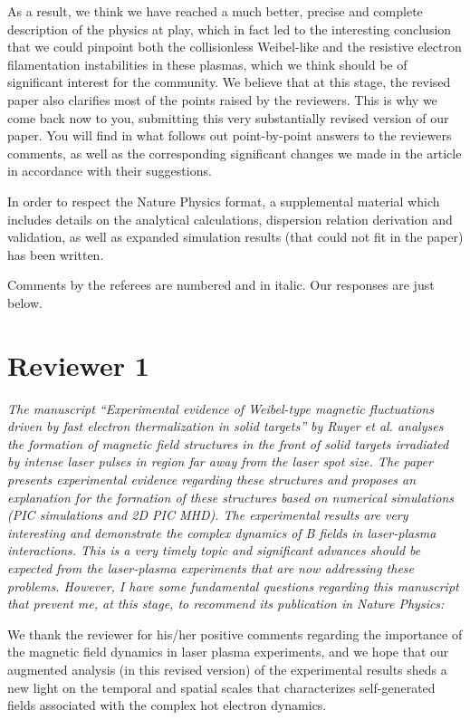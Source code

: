 \documentclass[aps,showpacs,superscriptaddress]{revtex4}%
\begin{document}
As a result, we think we have reached a much better, precise and complete description of the physics at play, which in fact led to the interesting conclusion that we could pinpoint both the  collisionless Weibel-like and the resistive electron filamentation instabilities in these plasmas, which we think should be of significant interest for the community. We believe that at this stage, the revised paper also clarifies most of the points raised by the reviewers. 
This is why we come back now to you, submitting this very substantially revised version of our paper. You will find in what follows out point-by-point answers to the reviewers comments, as well as the corresponding significant changes we made in the article in accordance with their suggestions.

In order to respect the Nature Physics format, a supplemental material which includes details on the analytical calculations, dispersion relation derivation and validation, as well as expanded simulation results (that could not fit in the paper) has been written.

Comments by the referees are numbered and in italic. Our responses are just below.


\section{Reviewer 1 }

\textit{
The manuscript “Experimental evidence of Weibel-type magnetic fluctuations driven by fast electron thermalization in solid targets” by Ruyer et al. analyses the formation of magnetic field structures in the front of solid targets irradiated by intense laser pulses in region far away from the laser spot size. The paper presents experimental evidence regarding these structures and proposes an explanation for the formation of these structures based on numerical simulations (PIC simulations and 2D PIC MHD). The experimental results are very interesting and demonstrate the complex dynamics of B fields in laser-plasma interactions. This is a very timely topic and significant advances should be expected from the laser-plasma experiments that are now addressing these problems.
However, I have some fundamental questions regarding this manuscript that prevent me, at this stage, to recommend its publication in Nature Physics:
}

We thank the reviewer for his/her positive comments regarding  the importance of the magnetic field dynamics in laser plasma experiments, and we hope that our  augmented analysis (in this revised version) of the experimental results sheds a new light on the temporal and spatial scales that characterizes self-generated fields associated with the complex hot electron dynamics.
\end{document}
